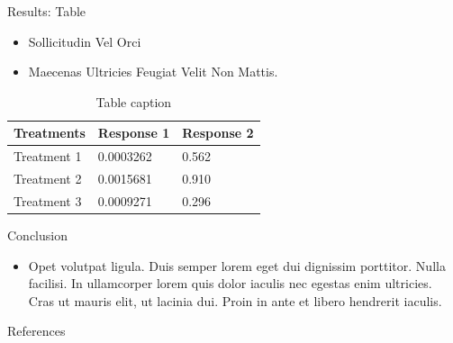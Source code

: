 \documentclass[final,hyperref={pdfpagelabels=false}]{beamer}
\begin{document}
\begin{frame}[t]
\begin{columns}[t]
\begin{column}{.465\textwidth}
\begin{block}{Results: Table}
\begin{itemize}
\item Sollicitudin Vel Orci
\item Maecenas Ultricies Feugiat Velit Non Mattis.
\end{itemize}

\begin{table}
\begin{tabular}{l l l}
\toprule
\textbf{Treatments} & \textbf{Response 1} & \textbf{Response 2}\\
\midrule
Treatment 1 & 0.0003262 & 0.562 \\
Treatment 2 & 0.0015681 & 0.910 \\
Treatment 3 & 0.0009271 & 0.296 \\
\bottomrule
\end{tabular}
\caption{Table caption}
\end{table}
     
\end{block}



\begin{block}{Conclusion}

\begin{itemize}
\item Opet \alert{volutpat} ligula. Duis semper lorem eget dui dignissim porttitor. Nulla facilisi. In ullamcorper lorem quis dolor iaculis nec egestas enim ultricies. Cras ut mauris elit, ut lacinia dui. Proin in ante et libero hendrerit iaculis.
\end{itemize}

\end{block}


\begin{block}{References}
        
\nocite{*} %
\small{
}

\end{block}


\end{column}
\end{columns}
\end{frame}
\end{document}
